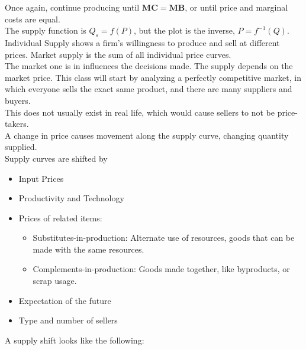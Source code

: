 \documentclass[nobib]{tufte-handout}
\begin{document}
Once again, continue producing until $\mathbf{MC=MB}$, or until price and marginal costs are equal.\\
The supply function is $Q_s=f(P)$, but the plot is the inverse, $P=f^{-1}(Q)$.\\
Individual Supply shows a firm's willingness to produce and sell at different prices. Market supply is the sum of all individual price curves.\\
The market one is in influences the decisions made. The supply depends on the market price. This class will start by analyzing a perfectly competitive market, in which everyone sells the exact same product, and there are many suppliers and buyers.\\
This does not usually exist in real life, which would cause sellers to not be price-takers.\\
A change in price causes movement along the supply curve, changing quantity supplied.\\
Supply curves are shifted by
\begin{itemize}
    \item Input Prices
    \item Productivity and Technology
    \item Prices of related items:
          \begin{itemize}
              \item Substitutes-in-production: Alternate use of resources, goods that can be made
                    with the same resources.
              \item Complements-in-production: Goods made together, like byproducts, or scrap
                    usage.
          \end{itemize}
    \item Expectation of the future
    \item Type and number of sellers
\end{itemize}
A supply shift looks like the following:
\begin{center}
\end{center}
\end{document}
